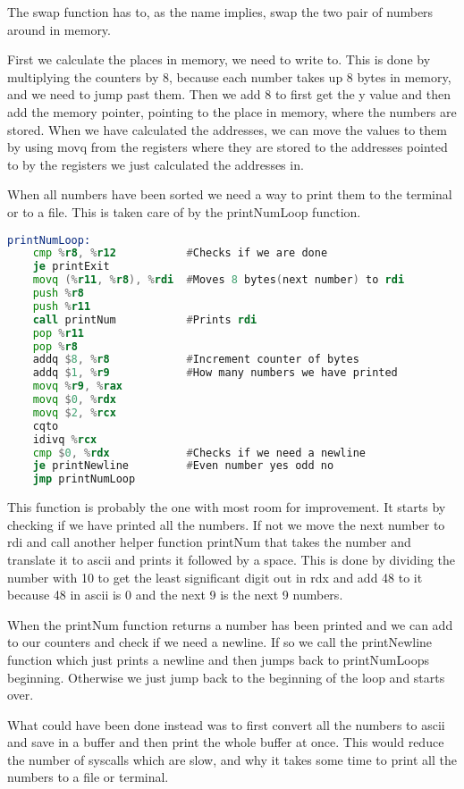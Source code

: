 \documentclass{article}
\begin{document}
The swap function has to, as the name implies, swap the two pair of numbers around in memory.

First we calculate the places in memory, we need to write to. This is done by multiplying the counters by 8, because each number takes up 8 bytes in memory, and we need to jump past them. Then we add 8 to first get the y value and then add the memory pointer, pointing to the place in memory, where the numbers are stored. When we have calculated the addresses, we can move the values to them by using movq from the registers where they are stored to the addresses pointed to by the registers we just calculated the addresses in.

When all numbers have been sorted we need a way to print them to the terminal or to a file. This is taken care of by the printNumLoop function.

\begin{lstlisting}[language=asm]
printNumLoop:
	cmp %r8, %r12           #Checks if we are done
	je printExit
	movq (%r11, %r8), %rdi 	#Moves 8 bytes(next number) to rdi 
	push %r8   
	push %r11
	call printNum           #Prints rdi
	pop %r11
	pop %r8
	addq $8, %r8            #Increment counter of bytes
	addq $1, %r9            #How many numbers we have printed
	movq %r9, %rax
	movq $0, %rdx
	movq $2, %rcx
	cqto
	idivq %rcx
	cmp $0, %rdx            #Checks if we need a newline
	je printNewline         #Even number yes odd no
	jmp printNumLoop
\end{lstlisting}

This function is probably the one with most room for improvement. It starts by checking if we have printed all the numbers. If not we move the next number to rdi and call another helper function printNum that takes the number and translate it to ascii and prints it followed by a space. This is done by dividing the number with 10 to get the least significant digit out in rdx and add 48 to it because 48 in ascii is 0 and the next 9 is the next 9 numbers. 

When the printNum function returns a number has been printed and we can add to our counters and check if we need a newline. If so we call the printNewline function which just prints a newline and then jumps back to printNumLoops beginning. Otherwise we just jump back to the beginning of the loop and starts over.

What could have been done instead was to first convert all the numbers to ascii and save in a buffer and then print the whole buffer at once. This would reduce the number of syscalls which are slow, and why it takes some time to print all the numbers to a file or terminal. 
\end{document}
